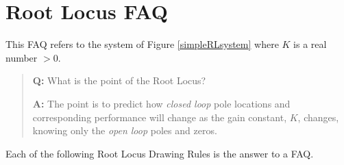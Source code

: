 




\section{Root Locus FAQ}

This FAQ refers to the system of Figure \ref{simpleRLsystem} where $K$ is a real
number $>0$.

\vspace{0.25in}
\begin{quotation}
{\bf Q:}  What is the point of the Root Locus?

{\bf A:}  The point is to predict how {\it closed loop} pole
locations  and  corresponding performance will change as the gain constant, $K$, changes,
knowing only the {\it open loop} poles and zeros.
\end{quotation}

\vspace{0.35in}	%



Each of the following Root Locus Drawing Rules is the answer to a FAQ.  

